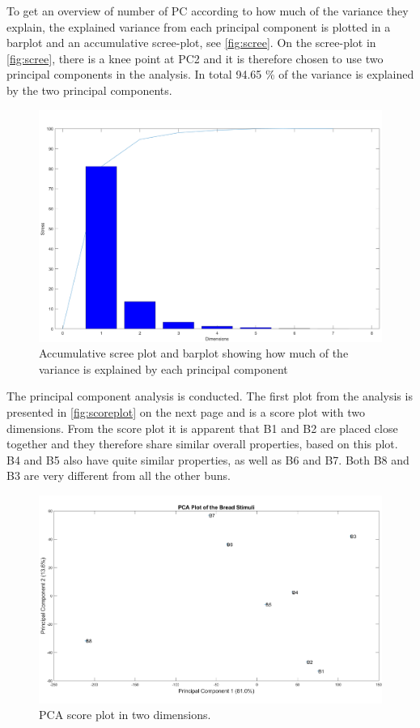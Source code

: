 \noindent
%
To get an overview of number of PC according to how much of the variance they explain, the explained variance from each principal component is plotted in a barplot and an accumulative scree-plot, see \autoref{fig:scree}. On the scree-plot in \autoref{fig:scree}, there is a knee point at PC2 and it is therefore chosen to use two principal components in the analysis. In total 94.65 \% of the variance is explained by the two principal components.
\begin{figure}[H]
\centering
\includegraphics[width =\textwidth]{Figure/Screeplot}
\caption{Accumulative scree plot and barplot showing how much of the variance is explained by each principal component}
\label{fig:scree}
\end{figure}
\noindent
%
%
The principal component analysis is conducted. The first plot from the analysis is presented in \autoref{fig:scoreplot} on the next page and is a score plot with two dimensions. \blankline
%
From the score plot it is apparent that B1 and B2 are placed close together and they therefore share similar overall properties, based on this plot. B4 and B5 also have quite similar properties, as well as B6 and B7. Both B8 and B3 are very different from all the other buns.
\newpage
%
\begin{figure}[H]
\centering
\includegraphics[width =\textwidth]{Figure/PCA_plot}
\caption{PCA score plot in two dimensions.}
\label{fig:scoreplot}
\end{figure}
